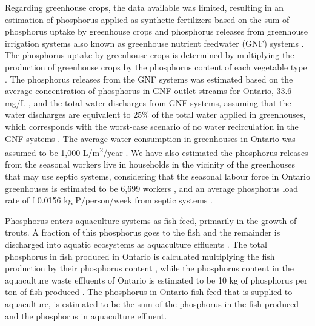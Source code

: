 \documentclass[authoryear]{elsarticle}
\begin{document}
Regarding greenhouse crops, the data available was limited, resulting in an estimation of phosphorus applied as synthetic fertilizers based on the sum of phosphorus uptake by greenhouse crops
and phosphorus releases from greenhouse irrigation systems also known as greenhouse nutrient feedwater (GNF) systems \citep{GNFOntario}. The phosphorus uptake by greenhouse crops is determined by multiplying the production of greenhouse crops \citep{HorticulturalOntario} by the phosphorus content of each vegetable type \citep{USDAHandbook}. The phosphorus releases from the GNF systems was estimated based on the average concentration of phosphorus in GNF outlet streams for  Ontario, 33.6 mg/L \citep{GreenhouseReleases}, and the total water discharges from GNF systems, assuming that the water discharges are equivalent to 25\% of the total water applied in greenhouses, which corresponds with the worst-case scenario of no water recirculation in the GNF systems \citep{GNFOntario}. The average water consumption in greenhouses in Ontario was assumed to be 1,000 L/m\textsuperscript{2}/year \citep{GrowingVeggiesOntario}. We have also estimated the phosphorus releases from the seasonal workers live in households in the vicinity of the greenhouses that may use septic systems, considering that the seasonal labour force in Ontario greenhouses is estimated to be 6,699 workers \citep{GreenhouseWorkers}, and an average phosphorus load rate of f 0.0156 kg P/person/week from septic systems \citep{oldfield2020estimation}.

Phosphorus enters aquaculture systems as fish feed, primarily in the growth of trouts. A fraction of this phosphorus goes to the fish and the remainder is discharged into aquatic ecosystems as aquaculture effluents
\citep{OntarioAquaculture}. 
The total phosphorus in fish produced in Ontario
is calculated multiplying the fish production \citep{StatisticsCanadaAquaculture} by their phosphorus content \citep{CanadianNutrientFile}, while the phosphorus content in the aquaculture waste effluents of Ontario is estimated to be 10 kg of phosphorus per ton of fish produced \citep{bureau2003chemical}. The phosphorus in Ontario fish feed that is supplied to aquaculture, is estimated to be the sum of the phosphorus in the fish produced and the phosphorus in aquaculture effluent.
\end{document}
